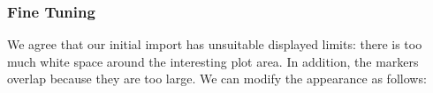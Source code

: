 \subsubsection{Fine Tuning}
We agree that our initial import has unsuitable displayed limits: there is too much white space around the interesting plot area. In addition, the markers overlap because they are too large. We can modify the appearance as follows:

\begin{codeexample}[]
\end{codeexample}

